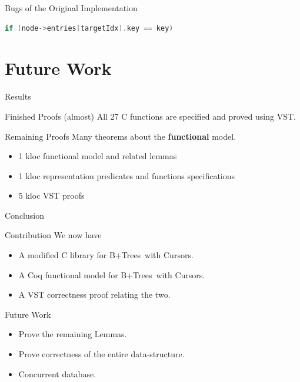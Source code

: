 \documentclass[page number,usenames,dvipsnames]{beamer}
\def\btrees{B+Trees}
\begin{document}
\begin{frame}[fragile]{Bugs of the Original Implementation}
  \begin{lstlisting}[language=C]
if (node->entries[targetIdx].key == key)
  \end{lstlisting}
  \vfill
  \bugcursor
\end{frame}

\section{Future Work}
\begin{frame}{Results}

  \begin{exampleblock}{Finished Proofs}
    {\color{Gray}(almost)} All 27 C functions are specified and proved using VST.
  \end{exampleblock}
  \vfill
  \begin{alertblock}{Remaining Proofs}
    Many theorems about the \textbf{functional} model.
  \end{alertblock}
  \vfill
  \begin{itemize}
  \item 1 kloc functional model and related lemmas
  \item 1 kloc representation predicates and functions specifications
  \item 5 kloc VST proofs
  \end{itemize}
  
\end{frame}

\begin{frame}{Conclusion}
  \begin{block}{Contribution}
    We now have
    \begin{itemize}
    \item A modified C library for \btrees\ with Cursors.
    \item A Coq functional model for \btrees\ with Cursors.
    \item A VST correctness proof relating the two.
    \end{itemize}
  \end{block}
  \vfill
  \begin{block}{Future Work}
    \begin{itemize}
    \item Prove the remaining Lemmas.
    \item Prove correctness of the entire data-structure.
    \item Concurrent database.
    \end{itemize}
  \end{block}
  
\end{frame}
\end{document}
